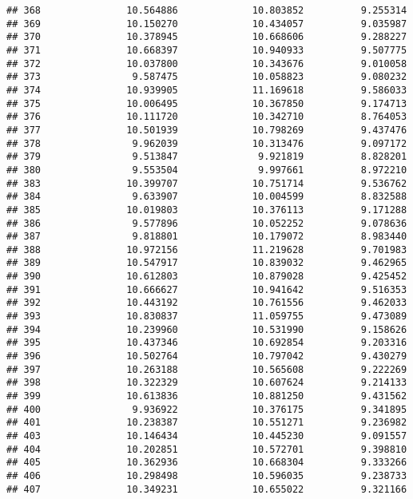 \documentclass[
]{article}
\begin{document}
\begin{verbatim}
## 368               10.564886             10.803852          9.255314
## 369               10.150270             10.434057          9.035987
## 370               10.378945             10.668606          9.288227
## 371               10.668397             10.940933          9.507775
## 372               10.037800             10.343676          9.010058
## 373                9.587475             10.058823          9.080232
## 374               10.939905             11.169618          9.586033
## 375               10.006495             10.367850          9.174713
## 376               10.111720             10.342710          8.764053
## 377               10.501939             10.798269          9.437476
## 378                9.962039             10.313476          9.097172
## 379                9.513847              9.921819          8.828201
## 380                9.553504              9.997661          8.972210
## 383               10.399707             10.751714          9.536762
## 384                9.633907             10.004599          8.832588
## 385               10.019803             10.376113          9.171288
## 386                9.577896             10.052252          9.078636
## 387                9.818801             10.179072          8.983440
## 388               10.972156             11.219628          9.701983
## 389               10.547917             10.839032          9.462965
## 390               10.612803             10.879028          9.425452
## 391               10.666627             10.941642          9.516353
## 392               10.443192             10.761556          9.462033
## 393               10.830837             11.059755          9.473089
## 394               10.239960             10.531990          9.158626
## 395               10.437346             10.692854          9.203316
## 396               10.502764             10.797042          9.430279
## 397               10.263188             10.565608          9.222269
## 398               10.322329             10.607624          9.214133
## 399               10.613836             10.881250          9.431562
## 400                9.936922             10.376175          9.341895
## 401               10.238387             10.551271          9.236982
## 403               10.146434             10.445230          9.091557
## 404               10.202851             10.572701          9.398810
## 405               10.362936             10.668304          9.333266
## 406               10.298498             10.596035          9.238733
## 407               10.349231             10.655022          9.321166

\end{verbatim}
\end{document}

